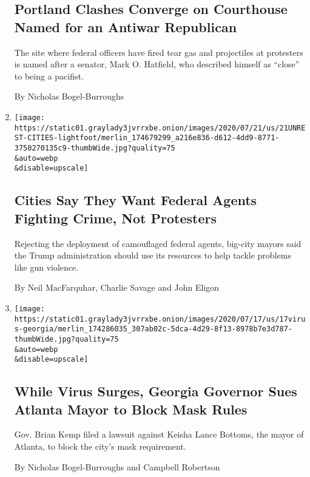 \begin{enumerate}
  \hypertarget{portland-clashes-converge-on-courthouse-named-for-an-antiwar-republican}{%
  \subsection{Portland Clashes Converge on Courthouse Named for an
  Antiwar
  Republican}\label{portland-clashes-converge-on-courthouse-named-for-an-antiwar-republican}}

  The site where federal officers have fired tear gas and projectiles at
  protesters is named after a senator, Mark O. Hatfield, who described
  himself as ``close'' to being a pacifist.

  By Nicholas Bogel-Burroughs
\item
  \href{/2020/07/21/us/trump-federal-agents-chicago.html}{}

  \texttt{[image: https://static01.graylady3jvrrxbe.onion/images/2020/07/21/us/21UNREST-CITIES-lightfoot/merlin\_174679299\_a216e836-d612-4dd9-8771-3750270135c9-thumbWide.jpg?quality=75\\\&auto=webp\\\&disable=upscale]}

  \hypertarget{cities-say-they-want-federal-agents-fighting-crime-not-protesters}{%
  \subsection{Cities Say They Want Federal Agents Fighting Crime, Not
  Protesters}\label{cities-say-they-want-federal-agents-fighting-crime-not-protesters}}

  Rejecting the deployment of camouflaged federal agents, big-city
  mayors said the Trump administration should use its resources to help
  tackle problems like gun violence.

  By Neil MacFarquhar, Charlie Savage and John Eligon
\item
  \href{/2020/07/17/us/brian-kemp-georgia-keisha-lance-bottoms-atlanta.html}{}

  \texttt{[image: https://static01.graylady3jvrrxbe.onion/images/2020/07/17/us/17virus-georgia/merlin\_174286035\_307ab02c-5dca-4d29-8f13-8978b7e3d787-thumbWide.jpg?quality=75\\\&auto=webp\\\&disable=upscale]}

  \hypertarget{while-virus-surges-georgia-governor-sues-atlanta-mayor-to-block-mask-rules}{%
  \subsection{While Virus Surges, Georgia Governor Sues Atlanta Mayor to
  Block Mask
  Rules}\label{while-virus-surges-georgia-governor-sues-atlanta-mayor-to-block-mask-rules}}

  Gov. Brian Kemp filed a lawsuit against Keisha Lance Bottoms, the
  mayor of Atlanta, to block the city's mask requirement.

  By Nicholas Bogel-Burroughs and Campbell Robertson
\end{enumerate}

